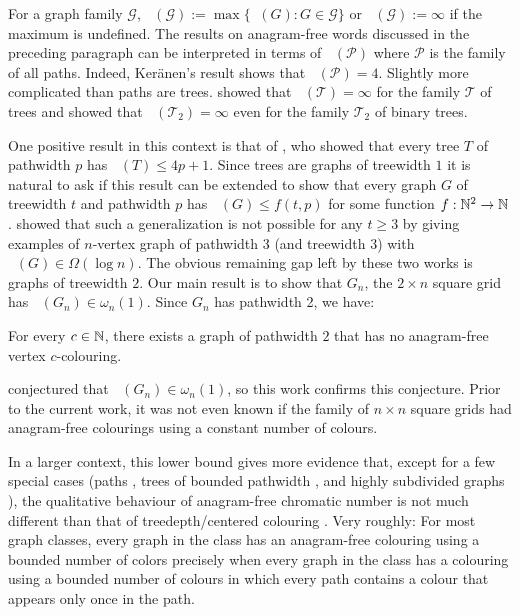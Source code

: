 \documentclass{patmorin}
\DeclareMathOperator{\afcn}{\dot{\chi}_\pi}
\begin{document}
For a graph family $\mathcal{G}$, $\afcn(\mathcal{G}):=\max\{\afcn(G):G\in\mathcal{G}\}$ or $\afcn(\mathcal{G}):=\infty$ if the maximum is undefined. The results on anagram-free words discussed in the preceding paragraph can be interpreted in terms of $\afcn(\mathcal{P})$ where $\mathcal{P}$ is the family of all paths. Indeed, Ker\"anen's result shows that $\afcn(\mathcal{P})=4$. Slightly more complicated than paths are trees.  \citet{wilson.wood:anagram-free} showed that $\afcn(\mathcal{T})=\infty$ for the family $\mathcal{T}$ of trees and \citet{kamcev.luczak.ea:anagram-free} showed that $\afcn(\mathcal{T}_2)=\infty$ even for the family $\mathcal{T}_2$ of binary trees.

One positive result in this context is that of
\citet{wilson.wood:anagram-free}, who showed that every tree $T$ of pathwidth $p$ has $\afcn(T)\le 4p+1$. Since trees are graphs of treewidth $1$ it is natural to ask if this result can be extended to show that every graph $G$ of treewidth $t$ and pathwidth $p$ has $\afcn(G)\le f(t,p)$ for some function $f:\mathbb{N}^2\to\mathbb{N}$.  \citet{carmi.dujmovic.ea:anagram-free} showed that such a generalization is not possible for any $t\ge 3$ by giving examples of $n$-vertex graph of pathwidth $3$ (and treewidth $3$) with $\afcn(G)\in\Omega(\log n)$.  The obvious remaining gap left by these two works is graphs of treewidth $2$. Our main result is to show that $G_n$, the $2\times n$ square grid has $\afcn(G_n)\in\omega_n(1)$. Since $G_n$ has pathwidth 2, we have:

\begin{thm}\label{main_vertex}
    For every $c\in\mathbb{N}$, there exists a graph of pathwidth $2$ that has no anagram-free vertex $c$-colouring.
\end{thm}

\citet[Section 7.1]{wilson:anagram-free} conjectured that $\afcn(G_n)\in\omega_n(1)$, so this work confirms this conjecture.  Prior to the current work, it was not even known if the family of $n\times n$ square grids had anagram-free colourings using a constant number of colours.

In a larger context, this lower bound gives more evidence that, except for a few special cases (paths \cite{evdokimov:strongly,pleasants:non-repetitive,keranen:abelian}, trees of bounded pathwidth \cite{wilson.wood:anagram-free}, and highly subdivided graphs \cite{wilson.wood:anagram-free2}), the qualitative behaviour of anagram-free chromatic number is not much different than that of treedepth/centered colouring \cite{nesetril.ossona:tree-depth}.  Very roughly: For most graph classes, every graph in the class has an anagram-free colouring using a bounded number of colors precisely when every graph in the class has a colouring using a bounded number of colours in which every path contains a colour that appears only once in the path.
\end{document}
